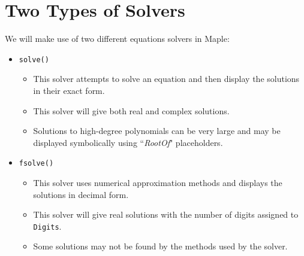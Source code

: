 
\begin{maplegroup}
\begin{mapleinput}
\end{mapleinput}
\mapleresult
\begin{maplelatex}
\end{maplelatex}
\mapleresult
\begin{maplelatex}
\end{maplelatex}
\end{maplegroup}

\section{Two Types of Solvers}
\label{sec:two_types_of_solvers}

We will make use of two different equations solvers in Maple:
\begin{itemize}
\item \texttt{solve()}
	\begin{itemize}
	\item This solver attempts to solve an equation and then display the solutions in their exact form.
	\item This solver will give both real and complex solutions.
	\item Solutions to high-degree polynomials can be very large and may be displayed symbolically using ``\textit{RootOf}" placeholders.
	\end{itemize}
\item \texttt{fsolve()}
	\begin{itemize}
	\item This solver uses numerical approximation methods and displays the solutions in decimal form. 
	\item This solver will give real solutions with the number of digits assigned to \texttt{Digits}.
	\item Some solutions may not be found by the methods used by the solver.
	\end{itemize}
\end{itemize}

